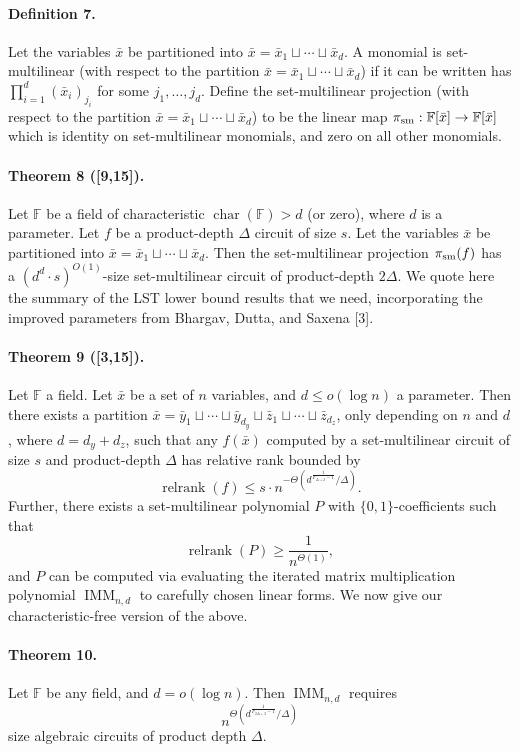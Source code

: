 \paragraph{Definition 7.} Let the variables $\bar x$ be partitioned into $\bar x=\bar x_1\sqcup\cdots\sqcup\bar x_d$. A monomial is set-multilinear (with respect to the partition $\bar x=\bar x_1\sqcup\cdots\sqcup\bar x_d$) if it can be written has $\prod_{i=1}^d(\bar x_i)_{j_i}$ for some $j_1,\ldots,j_d$.
Define the set-multilinear projection (with respect to the partition $\bar x=\bar x_1\sqcup\cdots\sqcup\bar x_d$) to be the linear map $\pi_{\rm sm}:\mathbb F[\bar x]\to\mathbb F[\bar x]$ which is identity on set-multilinear monomials, and zero on all other monomials.
\paragraph{Theorem 8 ([9,15]).} Let $\mathbb F$ be a field of characteristic $\operatorname{char}(\mathbb F)>d$ (or zero), where $d$ is a parameter. Let $f$ be a product-depth $\Delta$ circuit of size $s$. Let the variables $\bar x$ be partitioned into $\bar x=\bar x_1\sqcup\cdots\sqcup\bar x_d$. Then the set-multilinear projection $\pi_{\rm sm}(f)$ has a $(d^d\cdot s)^{O(1)}$-size set-multilinear circuit of product-depth $2\Delta$.
We quote here the summary of the LST lower bound results that we need, incorporating the improved parameters from Bhargav, Dutta, and Saxena [3].
\paragraph{Theorem 9 ([3,15]).} Let $\mathbb F$ a field. Let $\bar x$ be a set of $n$ variables, and $d\le o(\log n)$ a parameter. Then there exists a partition $\bar x=\bar y_1\sqcup\cdots\sqcup\bar y_{d_y}\sqcup\bar z_1\sqcup\cdots\sqcup\bar z_{d_z}$, only depending on $n$ and $d$, where $d=d_y+d_z$, such that any $f(\bar x)$ computed by a set-multilinear circuit of size $s$ and product-depth $\Delta$ has relative rank bounded by
\[\operatorname{relrank}(f)\le s\cdot n^{-\Theta(d^{\frac1{F_{\Delta+2}-1}}/\Delta)}.\]
Further, there exists a set-multilinear polynomial $P$ with $\{0,1\}$-coefficients such that
\[\operatorname{relrank}(P)\ge\frac1{n^{\Theta(1)}},\]
and $P$ can be computed via evaluating the iterated matrix multiplication polynomial $\operatorname{IMM}_{n,d}$ to carefully chosen linear forms.
We now give our characteristic-free version of the above.
\paragraph{Theorem 10.} Let $\mathbb F$ be any field, and $d=o(\log n)$. Then $\operatorname{IMM}_{n,d}$ requires
\[n^{\Theta(d^{\frac1{F_{2\Delta+2}-1}}/\Delta)}\]
size algebraic circuits of product depth $\Delta$.
